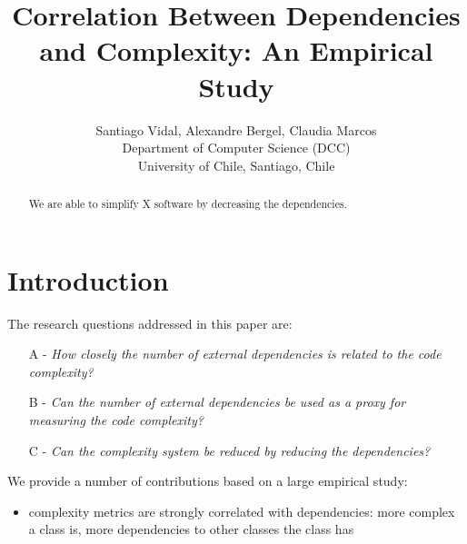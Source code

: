 \documentclass{sig-alternate}
\newcommand{\Title}{Correlation Between Dependencies and Complexity: An Empirical Study}
\newcommand{\TitleShort}{\Title}
\newcommand{\Authors}{Santiago Vidal, Alexandre Bergel, Claudia Marcos}
\newcommand{\AuthorsShort}{S. Vidal, A. Bergel, C. Marcos}
\newcommand{\seclabel}[1]{\label{sec:#1}}
\begin{document}
\title{\Title}

\author{\Authors\\[3mm]
Department of Computer Science (DCC)\\ University of Chile, Santiago, Chile\\[1 ex]
} 

\maketitle


\begin{abstract}




We are able to simplify X software by decreasing the dependencies.

\end{abstract}

\section{Introduction}\seclabel{introduction}



The research questions addressed in this paper are:
\begin{itemize}
\item[A -] \emph{How closely the number of external dependencies is related to the code complexity?}
\item[B -] \emph{Can the number of external dependencies be used as a proxy for measuring the code complexity?}
\item[C -] \emph{Can the complexity system be reduced by reducing the dependencies?}
\end{itemize}

We provide a number of contributions based on a large empirical study:
\begin{itemize}
\item complexity metrics are strongly correlated with dependencies: more complex a class is, more dependencies to other classes the class has
\end{itemize}
\end{document}
